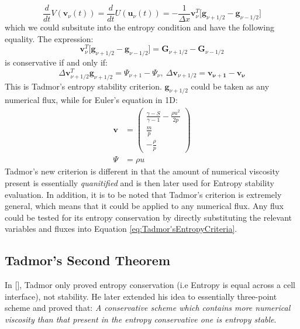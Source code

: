 \documentclass[a4paper]{article}
\numberwithin{equation}{section}
\begin{document}
\begin{equation}\label{eq:Convert1}
    \frac{d}{dt}V(\mathbf{v}_\nu(t)) = \frac{d}{dt} U(\mathbf{u}_\nu(t)) = -\frac{1}{\Delta x} \mathbf{v}_\nu^T \big[\mathbf{g}_{\nu + 1/2} - \mathbf{g}_{\nu - 1/2}\big]
\end{equation}
which we could subsitute into the entropy condition and have the following equality. The expression:
\begin{equation}\label{eq:Convert2}
    \mathbf{v}_\nu^T \big[\mathbf{g}_{\nu + 1/2} - \mathbf{g}_{\nu - 1/2} \big] = \mathbf{G}_{\nu + 1/2} - \mathbf{G}_{\nu - 1/2}
\end{equation}
is conservative if and only if:
\begin{equation}\label{eq:Tadmor'sEntropyCriteria}
    \Delta \mathbf{v}_{\nu + 1/2}^T \mathbf{g}_{\nu + 1/2} = \Psi_{\nu + 1} - \Psi_\nu, \ \Delta \mathbf{v}_{\nu + 1/2} = \mathbf{v_{\nu + 1}} - \mathbf{v}_\mathbf{\nu}
\end{equation}
This is Tadmor's entropy stability criterion. $\mathbf{g}_{\nu + 1/2}$ could be taken as any numerical flux, while for Euler's equation in 1D:
\begin{equation}
    \begin{split}
        \mathbf{v} &= 
        \begin{pmatrix}
            \frac{\gamma - S}{\gamma - 1}-\frac{\rho u^2}{2p} \\
            \frac{m}{p}\\
            -\frac{\rho}{p}
        \end{pmatrix}\\
        \Psi &= \rho u
    \end{split}
\end{equation} 
Tadmor's new criterion is different in that the amount of numerical viscosity present is essentially \textit{quanitified} and is then later used for Entropy stability evaluation. In addition, it is to be noted that Tadmor's criterion is extremely general, which means that it could be applied to any numerical flux. Any flux could be tested for its entropy conservation by directly substituting the relevant variables and fluxes into Equation \ref{eq:Tadmor'sEntropyCriteria}.


\subsection{Tadmor's Second Theorem}
In [], Tadmor only proved entropy conservation (i.e Entropy is equal across a cell interface), not stability. He later extended his idea to essentially three-point scheme and proved that: \textit{A conservative scheme which contains more numerical viscosity than that present in the entropy conservative one is entropy stable}. 
\end{document}

